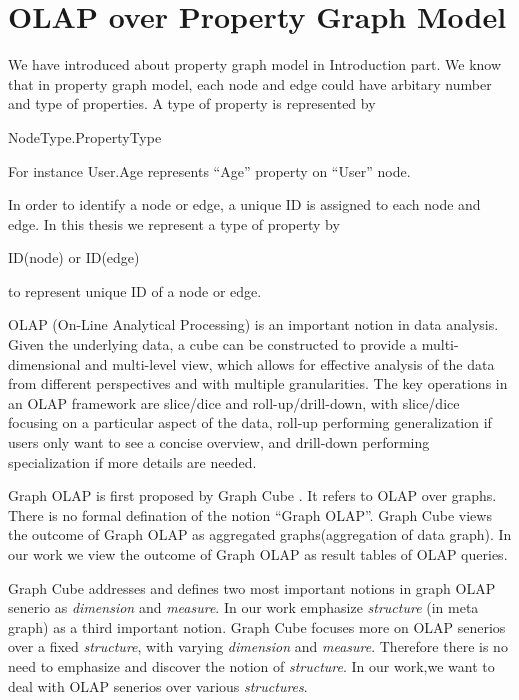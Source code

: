 \section{OLAP over Property Graph Model}
We have introduced about property graph model in Introduction part. We know that in property graph model, each node and edge could have arbitary number and type of properties. A type of property is represented by 

NodeType.PropertyType

For instance User.Age represents ``Age'' property on ``User'' node.

In order to identify a node or edge, a unique ID is assigned to each node and edge.  In this thesis we represent a type of property by 

ID(node) or ID(edge)

to represent unique ID of a node or edge.

OLAP (On-Line Analytical Processing) \cite{DBLP:conf/sigmod/BeyerR99} \cite{DBLP:journals/datamine/GrayCBLRVPP97} \cite{DBLP:conf/sigmod/ZhaoDN97}
is an important notion in data analysis. Given the underlying data, a cube can be constructed to provide a multi-dimensional and multi-level view, which allows for effective analysis of the data from different perspectives
and with multiple granularities. The key operations in an OLAP framework are slice/dice and roll-up/drill-down, with slice/dice focusing on a particular aspect of the data,
roll-up performing generalization if users only want to see a concise overview, and drill-down performing specialization
if more details are needed.

 Graph OLAP is first proposed by Graph Cube \cite{DBLP:conf/sigmod/ZhaoLXH11}. It refers to OLAP over graphs. There is no formal defination of the notion ``Graph OLAP''. Graph Cube \cite{DBLP:conf/sigmod/ZhaoLXH11} views the outcome of Graph OLAP as aggregated graphs(aggregation of data graph). In our work we view the outcome of Graph OLAP as result tables of OLAP queries. 
 
 Graph Cube \cite{DBLP:conf/sigmod/ZhaoLXH11}  addresses and defines two most important notions in graph OLAP senerio as \textit{dimension} and \textit{measure}. In our work emphasize \textit{structure} (in meta graph) as a third important notion. Graph Cube \cite{DBLP:conf/sigmod/ZhaoLXH11} focuses more on OLAP senerios over a fixed \textit{structure}, with varying \textit{dimension} and \textit{measure}. Therefore there is no need to emphasize and discover the notion of \textit{structure}. In our work,we want to deal with OLAP senerios over various \textit{structures}. 
 
